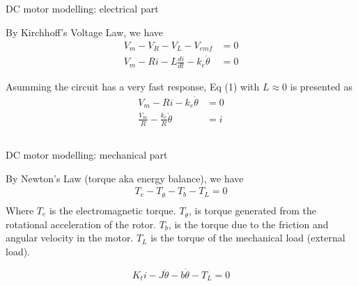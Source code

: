 \subsection{}
{
\begin{frame}{DC motor modelling: electrical part}

By Kirchhoff's Voltage Law, we have
\begin{equation}
\begin{split}
V_m - V_{R} - V_{L} - V_{emf} &= 0 \\
V_m - Ri - L \frac{di}{dt} - k_e \dot \theta  &= 0
\end{split}
\end{equation}

Asumming the circuit has a very fast response,
Eq (1) with $L \approx 0$ is presented as
\begin{equation}
\begin{split}
V_m - Ri - k_e \dot \theta &=0 \\
\frac{V_m}{R} - \frac{k_e}{R} \dot \theta &= i
\end{split}
\end{equation}



\end{frame}
}


\subsection{}
{
\begin{frame}{DC motor modelling: mechanical part}

By Newton's Law (torque aka energy balance), we have
\begin{equation} 
\begin{split}
T_e - T_{\dot \theta} - T_b - T_L = 0 \\
\end{split}
\end{equation}
Where $T_e$ is the electromagnetic torque. 
$T_{ \dot \theta }$, 
is torque generated from the rotational acceleration of the rotor. 
$T_b$, is the torque due to the friction and angular velocity in the motor. 
$T_L$ is the torque of the mechanical load (external load). 

\begin{equation}
K_t i - J \ddot  \theta - b \dot \theta  - T_L = 0
\end{equation}


\end{frame}
}


